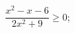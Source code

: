 \begin{ex}[type=inequality]
	\begin{condition}
		$ \dfrac{x^2 - x - 6}{2x^2 + 9}\geqslant0 ;$
	\end{condition}
	\answer{$ (-\infty;-2]\cup[3;+\infty); $}
\end{ex}